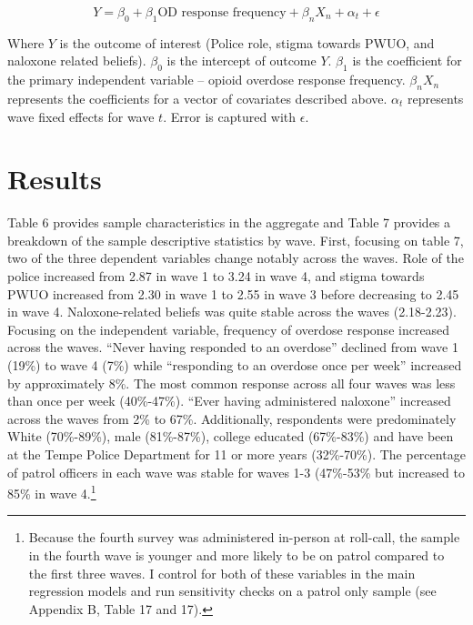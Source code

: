 \[Y = \beta_0 + \beta_1 \text{OD response frequency} + \beta_n X_n + \alpha_t + \epsilon \]

Where \(Y\) is the outcome of interest (Police role, stigma towards PWUO, and naloxone related beliefs). \(\beta_0\) is the intercept of outcome \(Y\). \(\beta_1\) is the coefficient for the primary independent variable -- opioid overdose response frequency. \(\beta_n X_n\) represents the coefficients for a vector of covariates described above. \(\alpha_t\) represents wave fixed effects for wave \(t\). Error is captured with \(\epsilon\).

\section{\centering Results}

Table 6 provides sample characteristics in the aggregate and Table 7 provides a breakdown of the sample descriptive statistics by wave. First, focusing on table 7, two of the three dependent variables change notably across the waves. Role of the police increased from 2.87 in wave 1 to 3.24 in wave 4, and stigma towards PWUO increased from 2.30 in wave 1 to 2.55 in wave 3 before decreasing to 2.45 in wave 4. Naloxone-related beliefs was quite stable across the waves (2.18-2.23). Focusing on the independent variable, frequency of overdose response increased across the waves. “Never having responded to an overdose” declined from wave 1 (19\%) to wave 4 (7\%) while “responding to an overdose once per week” increased by approximately 8\%. The most common response across all four waves was less than once per week (40\%-47\%). “Ever having administered naloxone” increased across the waves from 2\% to 67\%. Additionally, respondents were predominately White (70\%-89\%), male (81\%-87\%), college educated (67\%-83\%) and have been at the Tempe Police Department for 11 or more years (32\%-70\%). The percentage of patrol officers in each wave was stable for waves 1-3 (47\%-53\% but increased to 85\% in wave 4.\footnote{Because the fourth survey was administered in-person at roll-call, the sample in the fourth wave is younger and more likely to be on patrol compared to the first three waves. I control for both of these variables in the main regression models and run sensitivity checks on a patrol only sample (see Appendix B, Table 17 and 17).} 

